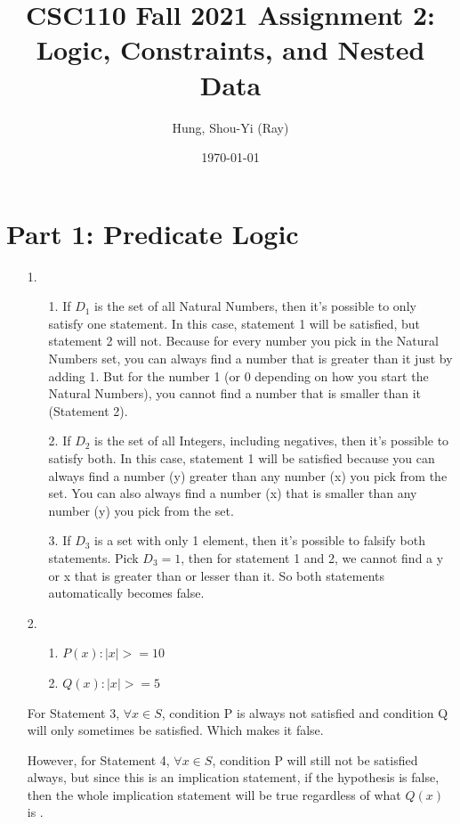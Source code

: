 \documentclass[fontsize=11pt]{article}
\title{CSC110 Fall 2021 Assignment 2: Logic, Constraints, and Nested Data}
\author{Hung, Shou-Yi (Ray)}
\date{\today}
\begin{document}
\maketitle

\section*{Part 1: Predicate Logic}

\begin{enumerate}

\item[1.]
    \begin{enumerate}
        \item[1.] If $D_1$ is the set of all Natural Numbers, then it's possible to only satisfy one statement. In this case, statement 1 will be satisfied, but statement 2 will not. Because for every number you pick in the Natural Numbers set, you can always find a number that is greater than it just by adding 1. But for the number 1 (or 0 depending on how you start the Natural Numbers), you cannot find a number that is smaller than it (Statement 2). 
        \item[2.] If $D_2$ is the set of all Integers, including negatives, then it's possible to satisfy both. In this case, statement 1 will be satisfied because you can always find a number (y) greater than any number (x) you pick from the set. You can also always find a number (x) that is smaller than any number (y) you pick from the set. 
        \item[3.] If $D_3$ is a set with only 1 element, then it's possible to falsify both statements. Pick $D_3 = {1}$, then for statement 1 and 2, we cannot find a y or x that is greater than or lesser than it. So both statements automatically becomes false. 
    \end{enumerate}

\item[2.]
    \begin{enumerate}
        \item[1.] $P(x): |x| >= 10$
        \item[2.] $Q(x): |x| >= 5$
    \end{enumerate}
   For Statement 3, $\forall x \in S$, condition P is always not satisfied and condition Q will only sometimes be satisfied. Which makes it false. 
   
   However, for Statement 4, $\forall x \in S$, condition P will still not be satisfied always, but since this is an implication statement, if the hypothesis is false, then the whole implication statement will be true regardless of what $Q(x)$ is . 
   

\end{enumerate}
\end{document}

